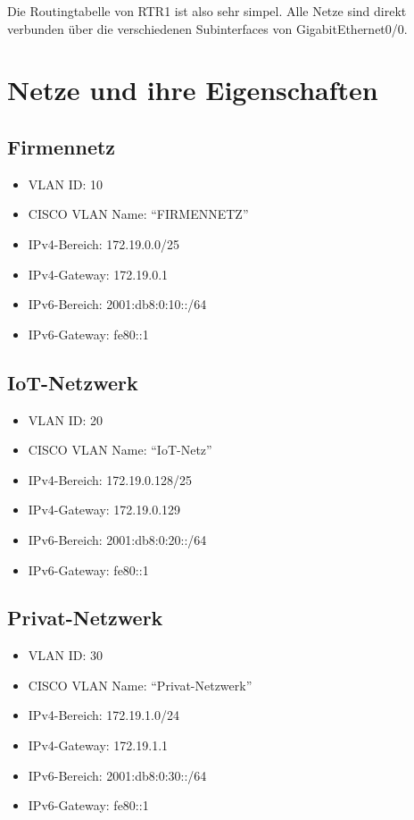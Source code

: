 \documentclass[11pt]{article}
\begin{document}
Die Routingtabelle von RTR1 ist also sehr simpel. Alle Netze sind direkt verbunden über die verschiedenen Subinterfaces von GigabitEthernet0/0.
\section{Netze und ihre Eigenschaften}
\label{sec:orgfe04721}
\subsection{Firmennetz}
\label{sec:org27af5b4}
\begin{itemize}
\item VLAN ID: 10
\item CISCO VLAN Name: ``FIRMENNETZ''
\item IPv4-Bereich: 172.19.0.0/25
\item IPv4-Gateway: 172.19.0.1
\item IPv6-Bereich: 2001:db8:0:10::/64
\item IPv6-Gateway: fe80::1
\end{itemize}
\subsection{IoT-Netzwerk}
\label{sec:orgae17260}
\begin{itemize}
\item VLAN ID: 20
\item CISCO VLAN Name: ``IoT-Netz''
\item IPv4-Bereich: 172.19.0.128/25
\item IPv4-Gateway: 172.19.0.129
\item IPv6-Bereich: 2001:db8:0:20::/64
\item IPv6-Gateway: fe80::1
\end{itemize}
\subsection{Privat-Netzwerk}
\label{sec:org2c590cb}
\begin{itemize}
\item VLAN ID: 30
\item CISCO VLAN Name: ``Privat-Netzwerk''
\item IPv4-Bereich: 172.19.1.0/24
\item IPv4-Gateway: 172.19.1.1
\item IPv6-Bereich: 2001:db8:0:30::/64
\item IPv6-Gateway: fe80::1
\end{itemize}
\end{document}
